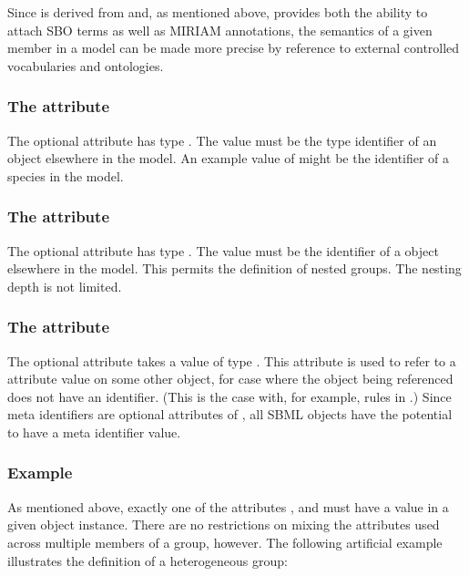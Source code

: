 Since \Member is derived from \SBase and, as mentioned above, \SBase provides both the ability to attach SBO terms as well as MIRIAM annotations, the semantics of a given member in a model can be made more precise by reference to external controlled vocabularies and ontologies.


\subsubsection{The \fixttspace{} attribute}
\label{member-idref-attribute}

The optional \Member attribute  has type .  The value must be the  type identifier of an object elsewhere in the model.  An example value of  might be the identifier of a species in the model.


\subsubsection{The \fixttspace{} attribute}
\label{member-groupidref-attribute}

The optional \Member attribute  has type .  The value must be the identifier of a \Group object elsewhere in the model.  This permits the definition of nested groups.  The nesting depth is not limited.


\subsubsection{The \fixttspace{} attribute}
\label{member-metaidref-attribute}

The optional \Member attribute  takes a value of type .  This attribute is used to refer to a  attribute value on some other object, for case where the object being referenced does not have an identifier.  (This is the case with, for example, rules in \sbmlthreecore.)  Since meta identifiers are optional attributes of \SBase, all SBML objects have the potential to have a meta identifier value.


\subsubsection{Example}

As mentioned above, exactly one of the attributes ,  and  must have a value in a given \Member object instance.  There are no restrictions on mixing the attributes used across multiple members of a group, however.  The following artificial example illustrates the definition of a heterogeneous group:

